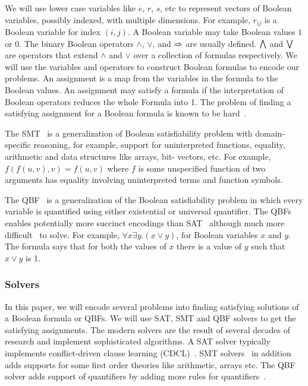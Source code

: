 \noindent We will use lower case variables like $e$, $r$, $s$, etc to represent vectors of
Boolean variables, possibly indexed, with multiple dimensions.
%
For example, $r_{ij}$ is a Boolean variable for index $(i,j)$.
%
%
A Boolean variable may take Boolean values $1$ or $0$.
%
The binary Boolean operators $\land$, $\lor$, and $\Rightarrow$ are usually defined.
%
$\bigwedge$ and $\bigvee$ are operators that extend $\land$ and $\lor$ over a collection of formulas respectively.
%
We will use the variables and operators to construct Boolean formulas to
encode our problems.
%
An assignment is a map from the variables in the formula to the Boolean values.
%
An assignment may satisfy a formula if the interpretation of Boolean operators
reduces the whole Formula into 1.
%
The problem of finding a satisfying assignment for a Boolean formula is known to be hard~\cite{cook1971complexity}.
%

The SMT~\cite{barrett2018satisfiability} is a generalization of Boolean satisfiability problem with domain-specific reasoning, for example, support for uninterpreted functions, equality, arithmetic and data structures like arrays, bit-
vectors, etc.
%
For example, $f(f(u,v),v)=f(u,v)$ where $f$ is some unspecified function of two arguments has equality involving uninterpreted terms and function symbols.

%
The QBF~\cite{buning2009theory, benedetti2008qbf} is a generalization of the Boolean satisfiability problem in which every variable is quantified using either existential or universal quantifier.
%
The QBFs enables potentially more succinct encodings than SAT~\cite{jussila2007compressing} although much more difficult~\cite{savitch1970relationships, stockmeyer1973word} to solve.
For example, $\forall x \exists y. (x \lor y)$, for Boolean variables $x$ and $y$.
%
The formula says that for both the values of $x$ there is a value of $y$
such that $x \lor y$ is 1.
%
%

\subsubsection{Solvers}
In this paper, we will encode several problems into finding satisfying solutions of a Boolean formula or QBFs.
%
We will use SAT, SMT and QBF solvers to get the satisfying assignments.
%
The modern solvers are the result of several decades of research
and implement sophisticated algorithms.
%
%
A SAT solver typically implements conflict-driven clause learning (CDCL)~\cite{biere2009conflict}.
SMT solvers~\cite{nieuwenhuis2006solving, barrett2018satisfiability} in addition adds supports for some first order theories like arithmetic, arrays etc.
% 
The QBF solver adds support of quantifiers by adding more rules for quantifiers~\cite{buning2009theory}.
%
%


